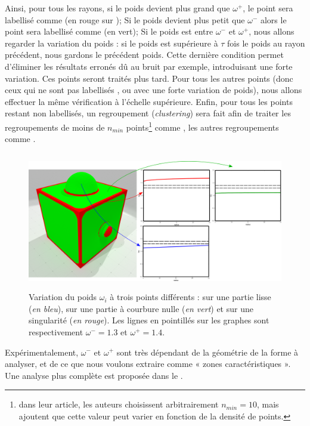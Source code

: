 Ainsi, pour tous les rayons, si le poids devient plus grand que $\omega^+$, le
point sera labellisé comme \Feature (en rouge sur
); Si le poids devient plus petit que
$\omega^-$ alors le point sera labellisé comme \NonFeature (en vert); Si le
poids est entre $\omega^-$ et $\omega^+$, nous allons regarder la variation du
poids : si le poids est supérieure à $\tau$ fois le poids au rayon précédent,
nous gardons le précédent poids. Cette dernière condition permet d'éliminer les
résultats erronés dû au bruit par exemple, introduisant une forte
variation. Ces points seront traités plus tard. Pour tous les autres points
(donc ceux qui ne sont pas labellisés \Feature, \NonFeature ou avec une forte
variation de poids), nous allons effectuer la même vérification à l'échelle
supérieure. Enfin, pour tous les points restant non labellisés, un regroupement
(\emph{clustering}) sera fait afin de traiter les regroupements de moins de
$n_{min}$ points\footnote{dans leur article, les auteurs choisissent
arbitrairement $n_{min}=10$, mais ajoutent que cette valeur peut varier en
fonction de la densité de points.} comme \NonFeature, les autres regroupements
comme \Feature.

\begin{figure}[ht]{
  \begin{center}
    \includegraphics[height=6cm]{figures/CubeSpherePlotTensor}
  \end{center}}
    \caption[Variation du poids $\omega_i$.]{Variation du poids $\omega_i$ à
    trois points différents : sur une partie lisse (\emph{en bleu}), sur une
    partie à courbure nulle (\emph{en vert}) et sur une singularité (\emph{en
    rouge}). Les lignes en pointillés sur les graphes sont respectivement
    $\omega^- = 1.3$ et $\omega^+ = 1.4$.\label{fig:tensor-cubesphere}}
\end{figure}


Expérimentalement, $\omega^-$ et $\omega^+$ sont très dépendant de la géométrie
de la forme à analyser, et de ce que nous voulons extraire comme « zones
caractéristiques ». Une analyse plus complète est proposée dans le
.
%
